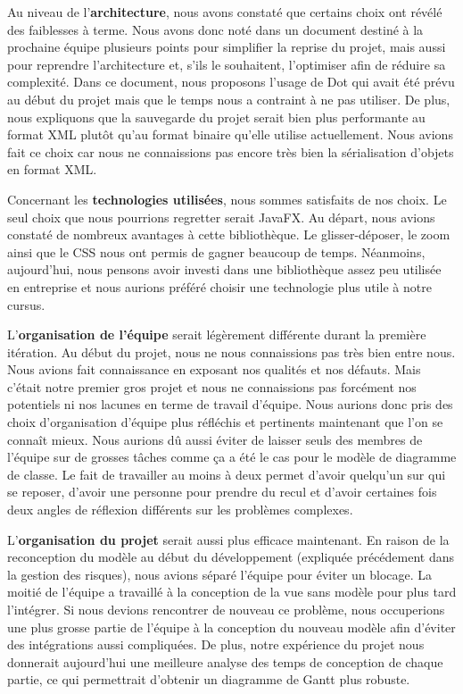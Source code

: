 \documentclass[hidelinks, 10pt,a4paper]{article}
\begin{document}
Au niveau de l'\textbf{architecture}, nous avons constaté que certains choix ont révélé des faiblesses à terme. 
Nous avons donc noté dans un document destiné à la prochaine équipe plusieurs points pour simplifier la reprise du projet, 
mais aussi pour reprendre l'architecture et, s'ils le souhaitent, l'optimiser afin de réduire sa complexité. \newline
Dans ce document, nous proposons l'usage de Dot qui avait été prévu au début du projet mais que le temps nous a contraint à ne pas utiliser.\newline
De plus, nous expliquons que la sauvegarde du projet serait bien plus performante au format XML plutôt qu'au format binaire qu'elle utilise actuellement.
Nous avions fait ce choix car nous ne connaissions pas encore très bien la sérialisation d'objets en format XML.
\newline

Concernant les \textbf{technologies utilisées}, nous sommes satisfaits de nos choix. Le seul choix que nous pourrions regretter serait JavaFX. 
Au départ, nous avions constaté de nombreux avantages à cette bibliothèque. 
Le glisser-déposer, le zoom ainsi que le CSS nous ont permis de gagner beaucoup de temps.
Néanmoins, aujourd'hui, nous pensons avoir investi dans une bibliothèque assez peu utilisée en entreprise 
et nous aurions préféré choisir une technologie plus utile à notre cursus.
\newline

L'\textbf{organisation de l'équipe} serait légèrement différente durant la première itération.
Au début du projet, nous ne nous connaissions pas très bien entre nous. Nous avions fait connaissance en exposant
nos qualités et nos défauts. Mais c'était notre premier gros projet et nous ne connaissions pas forcément nos potentiels ni nos lacunes
en terme de travail d'équipe.
Nous aurions donc pris des choix d'organisation d'équipe plus réfléchis et pertinents maintenant que l'on se connaît mieux.\newline
Nous aurions dû aussi éviter de laisser seuls des membres de l'équipe sur de grosses tâches comme ça a été le cas pour le modèle de diagramme de classe.
Le fait de travailler au moins à deux permet d'avoir quelqu'un sur qui se reposer, d'avoir une personne pour prendre du recul et d'avoir certaines
fois deux angles de réflexion différents sur les problèmes complexes.
\newline

L'\textbf{organisation du projet} serait aussi plus efficace maintenant. 
En raison de la reconception du modèle au début du développement (expliquée précédement dans la gestion des risques),
nous avions séparé l'équipe pour éviter un blocage. 
La moitié de l'équipe a travaillé à la conception de la vue sans modèle pour plus tard l'intégrer.\newline
Si nous devions rencontrer de nouveau ce problème, nous occuperions une plus grosse partie de l'équipe à 
la conception du nouveau modèle afin d'éviter des intégrations aussi compliquées. \newline
De plus, notre expérience du projet nous donnerait aujourd'hui une meilleure analyse des temps de 
conception de chaque partie, ce qui permettrait d'obtenir un diagramme de Gantt plus robuste.   
\end{document}
